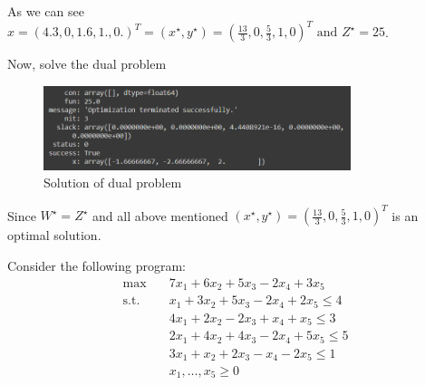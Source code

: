\documentclass{homework}
\begin{document}
\begin{enumerate}[label=(\alph*)]
	As we can see $x = (4.3, 0, 1.6, 1., 0.)^T =  (x^\star, y^\star) = (\frac{13}{3}, 0, \frac{5}{3}, 1, 0)^T \text{ and } Z^\star = 25$.

	Now, solve the dual problem

\begin{figure}[hbt!]
	\centering
	\includegraphics[width=0.8\textwidth]{dual_solution.png}
	\caption{Solution of dual problem}
\end{figure}
	Since $W^\star = Z^\star$ and all above mentioned $(x^\star, y^\star) = (\frac{13}{3}, 0, \frac{5}{3}, 1, 0)^T$ is an optimal solution.
\end{enumerate}
\exercise
Consider the following program:
\begin{align*}
	\text{max} \quad
	&7x_1 + 6x_2 + 5x_3 - 2x_4 + 3x_5\\
	\text{s.t.} \quad
	&x_1 + 3x_2 + 5x_3 - 2x_4 + 2x_5\leq 4 \\
	&4x_1 + 2x_2 - 2x_3 + x_4 + x_5\leq 3 \\
	&2x_1 + 4x_2 + 4x_3 - 2x_4 + 5x_5\leq 5 \\
	&3x_1 + x_2 + 2x_3 - x_4 - 2x_5\leq 1 \\
	&x_1, \dots, x_5 \geq 0
\end{align*}
\end{document}
